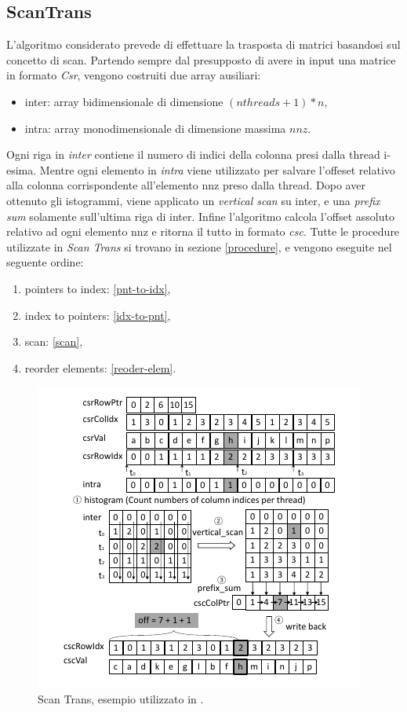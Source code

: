\documentclass[]{IEEEtran}
\begin{document}
	\subsection{ScanTrans}
	L'algoritmo considerato prevede di effettuare la trasposta di matrici basandosi sul concetto di scan. Partendo sempre dal presupposto di avere in input una matrice in formato \textit{Csr}, vengono costruiti due array ausiliari:
	\begin{itemize}
		\item inter: array bidimensionale di dimensione $ (nthreads+1) * n $,
		\item intra: array monodimensionale di dimensione massima $ nnz $.
	\end{itemize}
	Ogni riga in \textit{inter} contiene il numero di indici della colonna presi dalla thread i-esima. Mentre ogni elemento in \textit{intra} viene utilizzato per salvare l'offeset relativo alla colonna corrispondente all'elemento nnz preso dalla thread. Dopo aver ottenuto gli istogrammi, viene applicato un \textit{vertical scan} su inter, e una \textit{prefix sum} solamente sull'ultima riga di inter. Infine l'algoritmo calcola l'offset assoluto relativo ad ogni elemento nnz e ritorna il tutto in formato \textit{csc}.\newline
	Tutte le procedure utilizzate in \textit{Scan Trans} si trovano in sezione \ref{procedure}, e vengono eseguite nel seguente ordine:
	\begin{enumerate}
		\item pointers to index: \ref{pnt-to-idx},
		\item index to pointers: \ref{idx-to-pnt},
		\item scan: \ref{scan},
		\item reorder elements: \ref{reoder-elem}.
	\end{enumerate}
	
	\begin{figure}[H]
		\includegraphics[scale=0.6]{scantrans.png}
		\caption{Scan Trans, esempio utilizzato in \cite{parallelTrans}.}
		\label{scantrans}
	\end{figure}
	
\end{document}
